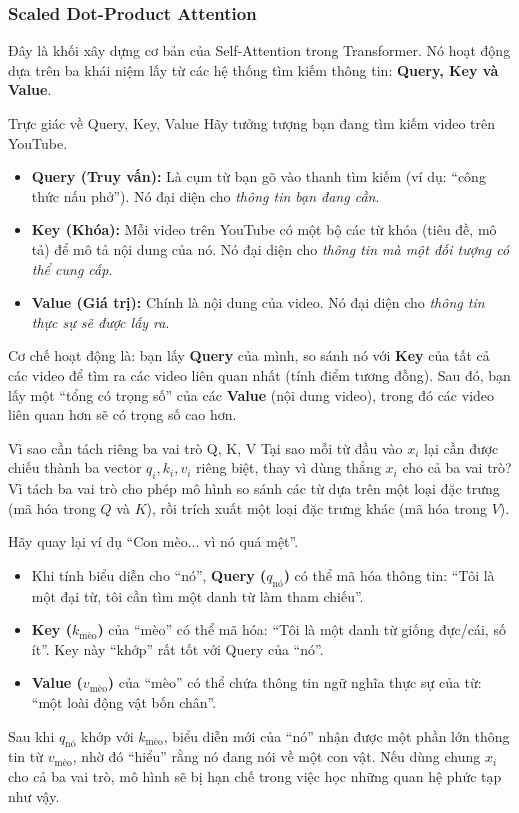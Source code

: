 \subsubsection{Scaled Dot-Product Attention}
Đây là khối xây dựng cơ bản của Self-Attention trong Transformer. Nó hoạt động dựa trên ba khái niệm lấy từ các hệ thống tìm kiếm thông tin: \textbf{Query, Key và Value}.

\begin{keyidea}{Trực giác về Query, Key, Value}
Hãy tưởng tượng bạn đang tìm kiếm video trên YouTube.
\begin{itemize}
    \item \textbf{Query (Truy vấn):} Là cụm từ bạn gõ vào thanh tìm kiếm (ví dụ: “công thức nấu phở”). Nó đại diện cho \textit{thông tin bạn đang cần}.
    \item \textbf{Key (Khóa):} Mỗi video trên YouTube có một bộ các từ khóa (tiêu đề, mô tả) để mô tả nội dung của nó. Nó đại diện cho \textit{thông tin mà một đối tượng có thể cung cấp}.
    \item \textbf{Value (Giá trị):} Chính là nội dung của video. Nó đại diện cho \textit{thông tin thực sự sẽ được lấy ra}.
\end{itemize}
Cơ chế hoạt động là: bạn lấy \textbf{Query} của mình, so sánh nó với \textbf{Key} của tất cả các video để tìm ra các video liên quan nhất (tính điểm tương đồng). Sau đó, bạn lấy một “tổng có trọng số” của các \textbf{Value} (nội dung video), trong đó các video liên quan hơn sẽ có trọng số cao hơn.
\end{keyidea}

\begin{assess}{Vì sao cần tách riêng ba vai trò Q, K, V}
Tại sao mỗi từ đầu vào $x_i$ lại cần được chiếu thành ba vector $q_i, k_i, v_i$ riêng biệt, thay vì dùng thẳng $x_i$ cho cả ba vai trò? Vì tách ba vai trò cho phép mô hình so sánh các từ dựa trên một loại đặc trưng (mã hóa trong $Q$ và $K$), rồi trích xuất một loại đặc trưng khác (mã hóa trong $V$).

Hãy quay lại ví dụ “Con mèo... vì nó quá mệt”.
\begin{itemize}
    \item Khi tính biểu diễn cho “nó”, \textbf{Query ($q_{\text{nó}}$)} có thể mã hóa thông tin: “Tôi là một đại từ, tôi cần tìm một danh từ làm tham chiếu”.
    \item \textbf{Key ($k_{\text{mèo}}$)} của “mèo” có thể mã hóa: “Tôi là một danh từ giống đực/cái, số ít”. Key này “khớp” rất tốt với Query của “nó”.
    \item \textbf{Value ($v_{\text{mèo}}$)} của “mèo” có thể chứa thông tin ngữ nghĩa thực sự của từ: “một loài động vật bốn chân”.
\end{itemize}
Sau khi $q_{\text{nó}}$ khớp với $k_{\text{mèo}}$, biểu diễn mới của “nó” nhận được một phần lớn thông tin từ $v_{\text{mèo}}$, nhờ đó “hiểu” rằng nó đang nói về một con vật. Nếu dùng chung $x_i$ cho cả ba vai trò, mô hình sẽ bị hạn chế trong việc học những quan hệ phức tạp như vậy.
\end{assess}

